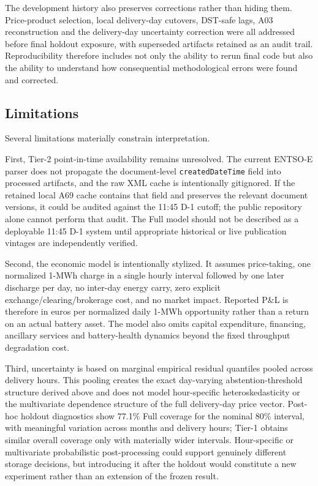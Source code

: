 The development history also preserves corrections rather than hiding them. Price-product selection, local delivery-day cutovers, DST-safe lags, A03 reconstruction and the delivery-day uncertainty correction were all addressed before final holdout exposure, with superseded artifacts retained as an audit trail. Reproducibility therefore includes not only the ability to rerun final code but also the ability to understand how consequential methodological errors were found and corrected.

\subsection{Limitations}

Several limitations materially constrain interpretation.

First, Tier-2 point-in-time availability remains unresolved. The current ENTSO-E parser does not propagate the document-level \texttt{createdDateTime} field into processed artifacts, and the raw XML cache is intentionally gitignored. If the retained local A69 cache contains that field and preserves the relevant document versions, it could be audited against the 11:45 D-1 cutoff; the public repository alone cannot perform that audit. The Full model should not be described as a deployable 11:45 D-1 system until appropriate historical or live publication vintages are independently verified.

Second, the economic model is intentionally stylized. It assumes price-taking, one normalized 1-MWh charge in a single hourly interval followed by one later discharge per day, no inter-day energy carry, zero explicit exchange/clearing/brokerage cost, and no market impact. Reported P\&L is therefore in euros per normalized daily 1-MWh opportunity rather than a return on an actual battery asset. The model also omits capital expenditure, financing, ancillary services and battery-health dynamics beyond the fixed throughput degradation cost.

Third, uncertainty is based on marginal empirical residual quantiles pooled across delivery hours. This pooling creates the exact day-varying abstention-threshold structure derived above and does not model hour-specific heteroskedasticity or the multivariate dependence structure of the full delivery-day price vector. Post-hoc holdout diagnostics show 77.1\% Full coverage for the nominal 80\% interval, with meaningful variation across months and delivery hours; Tier-1 obtains similar overall coverage only with materially wider intervals. Hour-specific or multivariate probabilistic post-processing could support genuinely different storage decisions, but introducing it after the holdout would constitute a new experiment rather than an extension of the frozen result.

